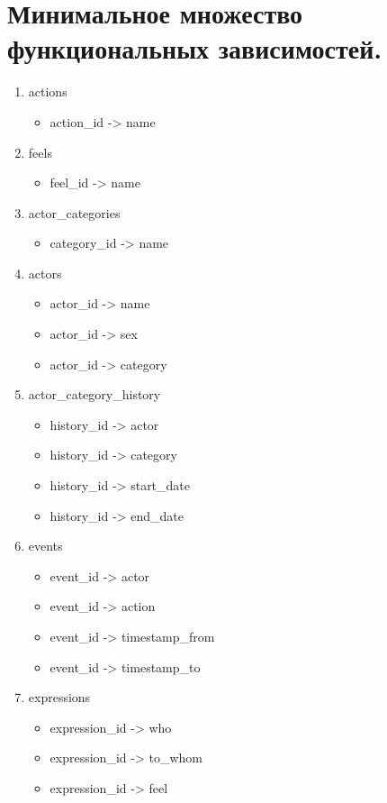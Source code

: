 \newpage

\section{Минимальное множество функциональных зависимостей.}
\begin{enumerate}
    \item actions
    \begin{itemize}
        \item action\_id -> name
    \end{itemize}
	\item feels
	\begin{itemize}
		\item feel\_id -> name
	\end{itemize}
	\item actor\_categories
	\begin{itemize}
		\item category\_id -> name
	\end{itemize}
	\item actors
	\begin{itemize}
		\item actor\_id -> name
		\item actor\_id -> sex
		\item actor\_id -> category
	\end{itemize}
	\item actor\_category\_history
	\begin{itemize}
		\item history\_id -> actor
		\item history\_id -> category
		\item history\_id -> start\_date
		\item history\_id -> end\_date
	\end{itemize}
	\item events
	\begin{itemize}
		\item event\_id -> actor
		\item event\_id -> action
		\item event\_id -> timestamp\_from
		\item event\_id -> timestamp\_to
	\end{itemize}
	\item expressions
	\begin{itemize}
		\item expression\_id -> who
		\item expression\_id -> to\_whom
		\item expression\_id -> feel
	\end{itemize}
\end{enumerate}

